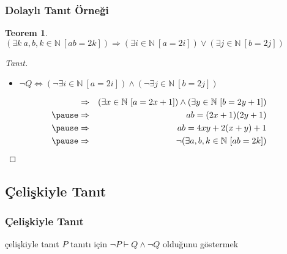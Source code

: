 \documentclass[dvipsnames]{beamer}
\theoremstyle{definition}
\theoremstyle{example}
\theoremstyle{plain}
\newtheorem{teorem}[theorem]{Teorem}
\begin{document}
\begin{frame}
  \frametitle{Dolaylı Tanıt Örneği}

  \begin{teorem}
    $(\exists k~a,b,k \in \mathbb{N}~[ab=2k]) \Rightarrow
      (\exists i \in \mathbb{N}~[a=2i]) \vee
      (\exists j \in \mathbb{N}~[b=2j])$
  \end{teorem}

  \pause
  \begin{proof}[Tanıt]
    \begin{itemize}
      \item $\neg Q \Leftrightarrow (\neg \exists i \in \mathbb{N}~[a=2i])
                          \wedge (\neg \exists j \in \mathbb{N}~[b=2j])$
    \end{itemize}

    \pause
    \begin{eqnarray*}
      & \Rightarrow & (\exists x \in \mathbb{N}~[a=2x+1])
               \wedge (\exists y \in \mathbb{N}~[b=2y+1])\\\pause
      & \Rightarrow & ab=(2x+1)(2y+1)\\\pause
      & \Rightarrow & ab=4xy+2(x+y)+1\\\pause
      & \Rightarrow & \neg (\exists a,b,k \in \mathbb{N}~[ab=2k])
    \end{eqnarray*}
  \end{proof}
\end{frame}

\subsection{Çelişkiyle Tanıt}

\begin{frame}
  \frametitle{Çelişkiyle Tanıt}

  \begin{block}{çelişkiyle tanıt}
    $P$ tanıtı için $\neg P \vdash Q \wedge \neg Q$ olduğunu göstermek
  \end{block}
\end{frame}
\end{document}
